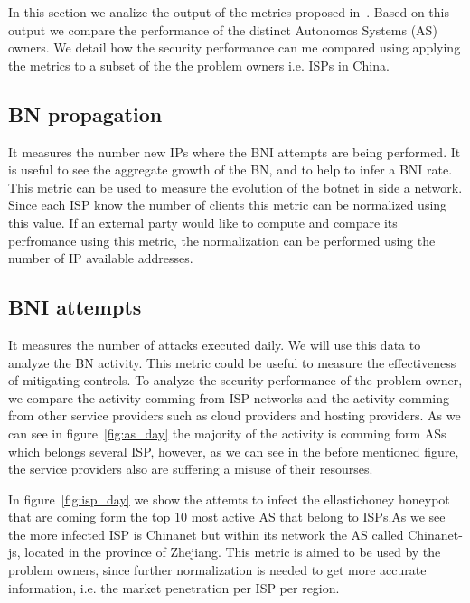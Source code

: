 \label{cap:sec2}
In this section we analize the output of the metrics proposed in~\cite{owr_article}. Based on this output we compare the performance of the distinct Autonomos Systems (AS) owners. We detail how the security performance can me compared using applying the metrics to a subset of the the problem owners i.e. ISPs in China.



\subsection{BN propagation}
It measures the number new IPs where the BNI attempts are being performed. It is useful to see the aggregate growth of the BN, and to help to infer a BNI rate.
This metric can be used to measure the evolution of the botnet in side a network. Since each ISP know the number of clients this metric can be normalized using this value. If an external party would like to compute and compare its perfromance using this metric, the normalization can be performed using the number of IP available addresses.

\subsection{BNI attempts}
It measures the number of attacks executed daily. We will use this data to analyze the BN activity. This metric could be useful to measure the effectiveness of mitigating controls. To analyze the security performance of the problem owner, we compare the activity comming from ISP networks and the activity comming from other service providers such as cloud providers and hosting providers. As we can see in figure~\ref{fig:as_day} the majority of the activity is comming form ASs which belongs several ISP, however, as we can see in the before mentioned figure, the service providers also are suffering a misuse of their resourses.

In figure~\ref{fig:isp_day} we show the attemts to infect the ellastichoney honeypot that are coming form the top 10 most active AS that belong to ISPs.As we see the more infected ISP is Chinanet but within its network the AS called Chinanet-js, located in the province of Zhejiang. This metric is aimed to be used by the problem owners, since further normalization is needed to get more accurate information, i.e. the market penetration per ISP per region.
